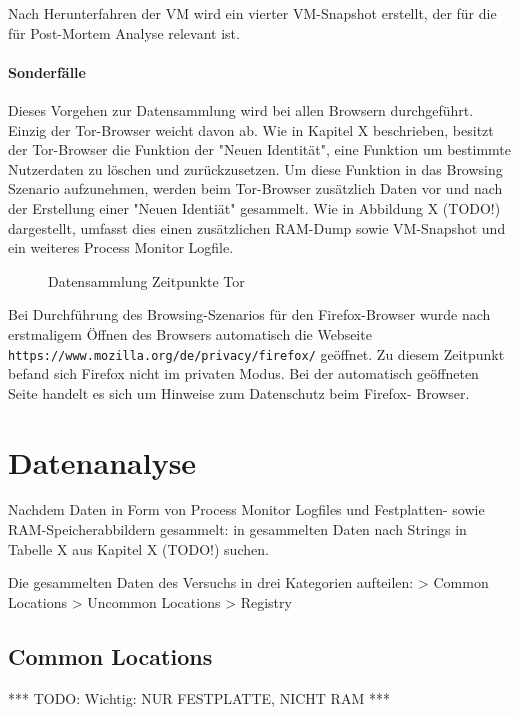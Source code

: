 Nach Herunterfahren der VM wird ein vierter VM-Snapshot erstellt, der für die für Post-Mortem Analyse relevant ist.

\paragraph*{Sonderfälle}

Dieses Vorgehen zur Datensammlung wird bei allen Browsern durchgeführt. Einzig der Tor-Browser weicht davon ab. Wie in Kapitel X beschrieben, besitzt der Tor-Browser die Funktion der "Neuen Identität", eine Funktion um bestimmte Nutzerdaten zu löschen und zurückzusetzen.
Um diese Funktion in das Browsing Szenario aufzunehmen, werden beim Tor-Browser zusätzlich Daten vor und nach der Erstellung einer "Neuen Identiät" gesammelt. Wie in Abbildung X (TODO!) dargestellt, umfasst dies einen zusätzlichen RAM-Dump sowie VM-Snapshot und ein weiteres Process Monitor Logfile.
\begin{figure}[h!]
	\centering
	\small
	\centerline{\resizebox{\linewidth}{!}{}}
	\caption{Datensammlung Zeitpunkte Tor}
	\label{fig:jes}
\end{figure}
	
Bei Durchführung des Browsing-Szenarios für den Firefox-Browser wurde nach erstmaligem Öffnen des Browsers automatisch die Webseite \texttt{https://www.mozilla.org/de/privacy/firefox/} geöffnet. Zu diesem Zeitpunkt befand sich Firefox nicht im privaten Modus. Bei der automatisch geöffneten Seite handelt es sich um Hinweise zum Datenschutz beim Firefox- Browser.

\section{Datenanalyse}

Nachdem Daten in Form von Process Monitor Logfiles und Festplatten- sowie RAM-Speicherabbildern gesammelt: in gesammelten Daten nach Strings in Tabelle X aus Kapitel X (TODO!) suchen. 

Die gesammelten Daten des Versuchs in drei Kategorien aufteilen:
> Common Locations
> Uncommon Locations	
> Registry

\subsection{Common Locations}

*** TODO: Wichtig: NUR FESTPLATTE, NICHT RAM ***

